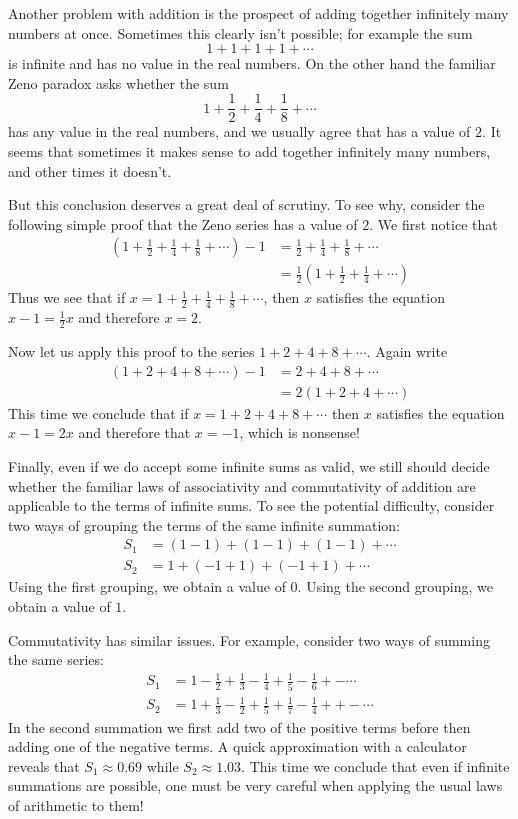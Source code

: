 \documentclass[11pt,oneside]{amsbook}
\theoremstyle{definition}
\theoremstyle{plain}
\theoremstyle{definition}
\theoremstyle{remark}
\numberwithin{equation}{section}
\numberwithin{figure}{section}
\begin{document}
Another problem with addition is the prospect of adding together infinitely many numbers at once. Sometimes this clearly isn't possible; for example the sum
\[1+1+1+1+\cdots
\]
is infinite and has no value in the real numbers. On the other hand the familiar Zeno paradox asks whether the sum
\[1+\frac12+\frac14+\frac18+\cdots
\]
has any value in the real numbers, and we usually agree that has a value of $2$. It seems that sometimes it makes sense to add together infinitely many numbers, and other times it doesn't.

But this conclusion deserves a great deal of scrutiny. To see why, consider the following simple proof that the Zeno series has a value of $2$. We first notice that
\begin{align*}
  \left(1+\frac12+\frac14+\frac18+\cdots\right)-1
  &=\frac12+\frac14+\frac18+\cdots\\                                  
  &=\frac12\left(1+\frac12+\frac14+\cdots\right)
\end{align*}
Thus we see that if $x=1+\frac12+\frac14+\frac18+\cdots$, then $x$ satisfies the equation $x-1=\frac12x$ and therefore $x=2$.

Now let us apply this proof to the series $1+2+4+8+\cdots$. Again write
\begin{align*}
  (1+2+4+8+\cdots)-1&=2+4+8+\cdots\\
                    &=2(1+2+4+\cdots)
\end{align*}
This time we conclude that if $x=1+2+4+8+\cdots$ then $x$ satisfies the equation $x-1=2x$ and therefore that $x=-1$, which is nonsense!

Finally, even if we do accept some infinite sums as valid, we still should decide whether the familiar laws of associativity and commutativity of addition are applicable to the terms of infinite sums. To see the potential difficulty, consider two ways of grouping the terms of the same infinite summation:
\begin{align*}
S_1&=(1-1)+(1-1)+(1-1)+\cdots\\
S_2&=1+(-1+1)+(-1+1)+\cdots
\end{align*}
Using the first grouping, we obtain a value of $0$. Using the second grouping, we obtain a value of $1$.

Commutativity has similar issues. For example, consider two ways of summing the same series:
\begin{align*}
S_1&=1-\frac12+\frac13-\frac14+\frac15-\frac16+-\cdots\\
S_2&=1+\frac13-\frac12+\frac15+\frac17-\frac14++-\cdots
\end{align*}
In the second summation we first add two of the positive terms before then adding one of the negative terms. A quick approximation with a calculator reveals that $S_1\approx0.69$ while $S_2\approx1.03$. This time we conclude that even if infinite summations are possible, one must be very careful when applying the usual laws of arithmetic to them!
\end{document}
